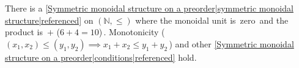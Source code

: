 
There is a \ref{Symmetric monoidal structure on a preorder|symmetric monoidal structure|referenced} on $(\mathbb{N}, \leq)$ where the monoidal unit is \,zero\, and the product is \,$+$ ($6+4=10$)\,. Monotonicity (\,$(x_1,x_2)\leq(y_1,y_2) \implies x_1+x_2 \leq y_1+y_2$\,) and other \ref{Symmetric monoidal structure on a preorder|conditions|referenced} hold.
